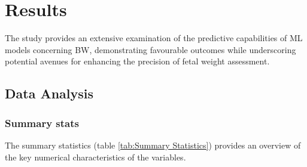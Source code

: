 \documentclass[12pt]{article}
\begin{document}
\section{Results}
The study provides an extensive examination of the predictive capabilities of ML models concerning BW, demonstrating favourable outcomes while underscoring potential avenues for enhancing the precision of fetal weight assessment.

\subsection{Data Analysis}
\subsubsection{Summary stats}
The summary statistics (table \ref{tab:Summary Statistics}) provides an overview of the key numerical characteristics of the variables.
\end{document}
